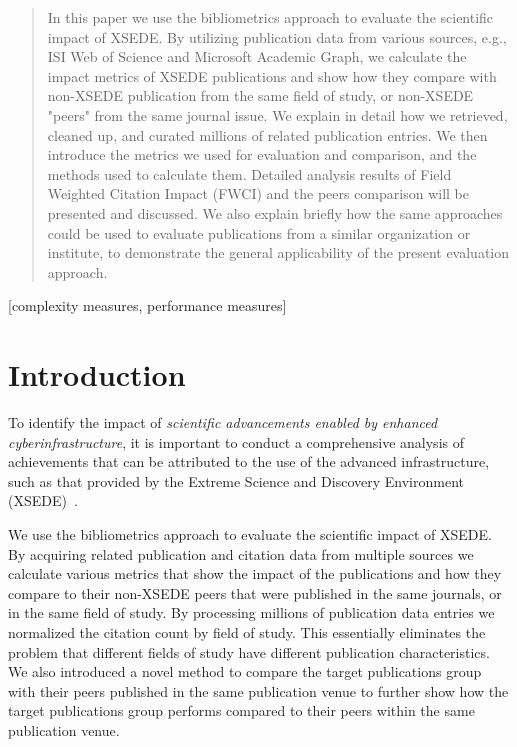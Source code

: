 \documentclass{sig-alternate}
\begin{document}
\begin{abstract}

  In this paper we use the bibliometrics approach to evaluate the
  scientific impact of XSEDE.  By utilizing publication data from
  various sources, e.g., ISI Web of Science and Microsoft Academic
  Graph, we calculate the impact metrics of XSEDE publications and
  show how they compare with non-XSEDE publication from the same field
  of study, or non-XSEDE "peers" from the same journal issue. We
  explain in detail how we retrieved, cleaned up, and curated millions
  of related publication entries.  We then introduce the metrics we
  used for evaluation and comparison, and the methods used to
  calculate them. Detailed analysis results of Field Weighted Citation
  Impact (FWCI) and the peers comparison will be presented and
  discussed. We also explain briefly how the same approaches could be
  used to evaluate publications from a similar organization or
  institute, to demonstrate the general applicability of the present
  evaluation approach.


\end{abstract}


\vspace{-6pt}

[complexity measures,
performance measures]



\section{Introduction} 

To identify the impact of {\em scientific advancements enabled by
  enhanced cyberinfrastructure}, it is important to conduct a
comprehensive analysis of achievements that can be attributed to the
use of the advanced infrastructure, such as that provided by the
Extreme Science and Discovery Environment
(XSEDE)~\cite{www-xsede,xsede}.

We use the bibliometrics approach to evaluate the scientific impact of
XSEDE. By acquiring related publication and citation data from
multiple sources we calculate various metrics that show the impact of
the publications and how they compare to their non-XSEDE peers that
were published in the same journals, or in the same field of study. By
processing millions of publication data entries we normalized the
citation count by field of study. This essentially eliminates the
problem that different fields of study have different publication
characteristics. We also introduced a novel method to compare the
target publications group with their peers published in the same
publication venue to further show how the target publications group
performs compared to their peers within the same publication venue.
\end{document}
